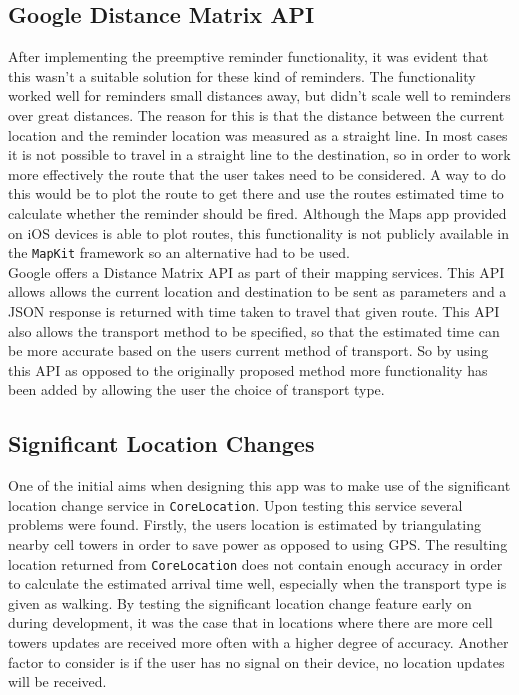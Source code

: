 \documentclass[12pt]{report}
\begin{document}
\subsection{Google Distance Matrix API}

After implementing the preemptive reminder functionality, it was evident that this wasn't a suitable solution for these kind of reminders. The functionality worked well for reminders small distances away, but didn't scale well to reminders over great distances. The reason for this is that the distance between the current location and the reminder location was measured as a straight line. In most cases it is not possible to travel in a straight line to the destination, so in order to work more effectively the route that the user takes need to be considered. A way to do this would be to plot the route to get there and use the routes estimated time to calculate whether the reminder should be fired. Although the Maps app provided on iOS devices is able to plot routes, this functionality is not publicly available in the \texttt{MapKit} framework so an alternative had to be used.\\

Google offers a Distance Matrix API \cite{distanceapi} as part of their mapping services. This API allows allows the current location and destination to be sent as parameters and a JSON response is returned with time taken to travel that given route. This API also allows the transport method to be specified, so that the estimated time can be more accurate based on the users current method of transport. So by using this API as opposed to the originally proposed method more functionality has been added by allowing the user the choice of transport type.

\subsection{Significant Location Changes}\label{sec:significantlocation}

One of the initial aims when designing this app was to make use of the significant location change service in \texttt{CoreLocation}. Upon testing this service several problems were found. Firstly, the users location is estimated by triangulating nearby cell towers in order to save power as opposed to using GPS. The resulting location returned from \texttt{CoreLocation} does not contain enough accuracy in order to calculate the estimated arrival time well, especially when the transport type is given as walking. By testing the significant location change feature early on during development, it was the case that in locations where there are more cell towers updates are received more often with a higher degree of accuracy. Another factor to consider is if the user has no signal on their device, no location updates will be received.\\
\end{document}

